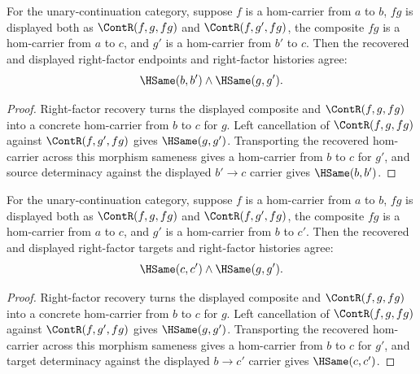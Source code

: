 \begin{theorem}
\label{thm:category-comp-right-factor-endpoint-deterministic}
For the unary-continuation category, suppose $f$ is a hom-carrier from $a$ to
$b$, $fg$ is displayed both as $\ContR(f,g,fg)$ and $\ContR(f,g',fg)$, the
composite $fg$ is a hom-carrier from $a$ to $c$, and $g'$ is a hom-carrier
from $b'$ to $c$. Then the recovered and displayed right-factor endpoints and
right-factor histories agree:
$$
\HSame(b,b')\wedge\HSame(g,g').
$$
\end{theorem}
\begin{proof}
Right-factor recovery turns the displayed composite and $\ContR(f,g,fg)$ into
a concrete hom-carrier from $b$ to $c$ for $g$. Left cancellation of
$\ContR(f,g,fg)$ against $\ContR(f,g',fg)$ gives $\HSame(g,g')$. Transporting
the recovered hom-carrier across this morphism sameness gives a hom-carrier
from $b$ to $c$ for $g'$, and source determinacy against the displayed
$b'\to c$ carrier gives $\HSame(b,b')$.
\end{proof}

\begin{theorem}
\label{thm:category-hom-carrier-comp-right-factor-target-deterministic}
For the unary-continuation category, suppose $f$ is a hom-carrier from $a$ to
$b$, $fg$ is displayed both as $\ContR(f,g,fg)$ and $\ContR(f,g',fg)$, the
composite $fg$ is a hom-carrier from $a$ to $c$, and $g'$ is a hom-carrier
from $b$ to $c'$. Then the recovered and displayed right-factor targets and
right-factor histories agree:
$$
\HSame(c,c')\wedge\HSame(g,g').
$$
\end{theorem}
\begin{proof}
Right-factor recovery turns the displayed composite and $\ContR(f,g,fg)$ into
a concrete hom-carrier from $b$ to $c$ for $g$. Left cancellation of
$\ContR(f,g,fg)$ against $\ContR(f,g',fg)$ gives $\HSame(g,g')$. Transporting
the recovered hom-carrier across this morphism sameness gives a hom-carrier
from $b$ to $c$ for $g'$, and target determinacy against the displayed
$b\to c'$ carrier gives $\HSame(c,c')$.
\end{proof}

